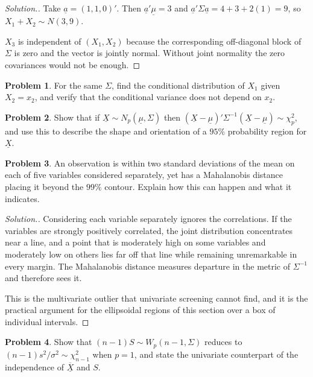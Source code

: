 \documentclass[11pt,a4paper]{article}
\theoremstyle{definition}
\newtheorem{problemx}{Problem}[section]
\newenvironment{problem}{\begin{problemx}}{\end{problemx}}
\newenvironment{solution}
  {\renewcommand{\qedsymbol}{}\begin{proof}[\textit{Solution}.]}
  {\end{proof}}
\begin{document}
\begin{solution}
Take $\underline{a}=(1,1,0)'$. Then
$\underline{a}'\underline{\mu}=3$ and
$\underline{a}'\Sigma\underline{a} = 4+3+2(1) = 9$, so
$X_1+X_2\sim N(3,9)$.

$X_3$ is independent of $(X_1,X_2)$ because the corresponding off-diagonal
block of $\Sigma$ is zero and the vector is jointly normal. Without joint
normality the zero covariances would not be enough.
\end{solution}

\begin{problem}
For the same $\Sigma$, find the conditional distribution of $X_1$ given
$X_2 = x_2$, and verify that the conditional variance does not depend on
$x_2$.
\end{problem}

\begin{problem}
Show that if $\underline{X}\sim N_p(\underline{\mu},\Sigma)$ then
$\left(\underline{X}-\underline{\mu}\right)'\Sigma^{-1}
\left(\underline{X}-\underline{\mu}\right)\sim\chi^{2}_p$, and use this to
describe the shape and orientation of a $95\%$ probability region for
$\underline{X}$.
\end{problem}

\begin{problem}
An observation is within two standard deviations of the mean on each of five
variables considered separately, yet has a Mahalanobis distance placing it
beyond the $99\%$ contour. Explain how this can happen and what it indicates.
\end{problem}

\begin{solution}
Considering each variable separately ignores the correlations. If the variables
are strongly positively correlated, the joint distribution concentrates near a
line, and a point that is moderately high on some variables and moderately low
on others lies far off that line while remaining unremarkable in every margin.
The Mahalanobis distance measures departure in the metric of $\Sigma^{-1}$ and
therefore sees it.

This is the multivariate outlier that univariate screening cannot find, and it
is the practical argument for the ellipsoidal regions of this section over a
box of individual intervals.
\end{solution}

\begin{problem}
Show that $(n-1)S \sim W_p(n-1,\Sigma)$ reduces to
$(n-1)s^{2}/\sigma^{2}\sim\chi^{2}_{n-1}$ when $p=1$, and state the univariate
counterpart of the independence of $\overline{\underline{X}}$ and $S$.
\end{problem}
\end{document}
